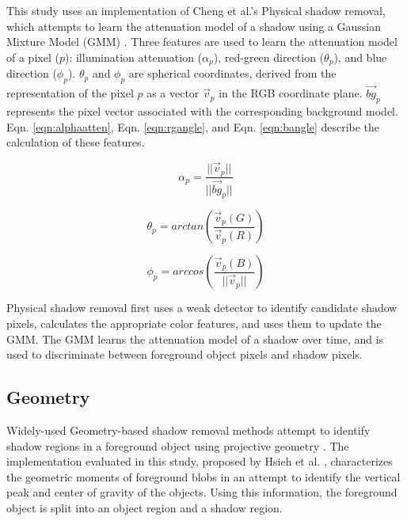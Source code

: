 This study uses an implementation of Cheng et al.'s Physical shadow removal, which attempts to learn the attenuation model of a shadow using a Gaussian Mixture Model (GMM) \cite{huang2009moving}. Three features are used to learn the attenuation model of a pixel ($p$): illumination attenuation ($\alpha_{p}$), red-green direction ($\theta_{p}$), and blue direction ($\phi_{p}$). $\theta_{p}$ and $\phi_{p}$ are spherical coordinates, derived from the representation of the pixel $p$ as a vector $\vec{v}_{p}$ in the RGB coordinate plane. $\vec{bg}_{p}$ represents the pixel vector associated with the corresponding background model. Eqn. \ref{eqn:alphaatten}, Eqn. \ref{eqn:rgangle}, and Eqn. \ref{eqn:bangle} describe the calculation of these features.

\begin{equation} \label{eqn:alphaatten}
\alpha_{p} = \dfrac{||\vec{v}_{p}||}{||\vec{bg}_{p}||}
\end{equation}

\begin{equation} \label{eqn:rgangle}
\theta_{p} = arctan(\dfrac{\vec{v}_{p}(G)}{\vec{v}_{p}(R)})
\end{equation}

\begin{equation} \label{eqn:bangle}
\phi_{p} = arccos(\dfrac{\vec{v}_{p}(B)}{||\vec{v}_{p}||})
\end{equation}

Physical shadow removal first uses a weak detector to identify candidate shadow pixels, calculates the appropriate color features, and uses them to update the GMM. The GMM learns the attenuation model of a shadow over time, and is used to discriminate between foreground object pixels and shadow pixels.

\subsection{Geometry}

Widely-used Geometry-based shadow removal methods attempt to identify shadow regions in a foreground object using projective geometry \cite{hsieh2003shadow, yoneyama2003moving, nicolas2006joint, fang2008method, chen2010human}. The implementation evaluated in this study, proposed by Hsieh et al. \cite{hsieh2003shadow}, characterizes the geometric moments of foreground blobs in an attempt to identify the vertical peak and center of gravity of the objects. Using this information, the foreground object is split into an object region and a shadow region.

